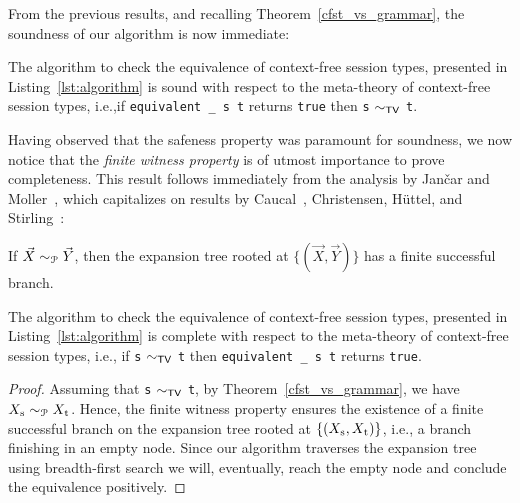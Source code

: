 From the previous results, and recalling Theorem~\ref{cfst_vs_grammar}, 
the soundness of our algorithm is now immediate:

\begin{theorem}
	The algorithm to check the equivalence of context-free session types,
	presented in Listing~\ref{lst:algorithm} is sound with respect to the 
	meta-theory of context-free session types, i.e.,\linebreak if 
	\lstinline|equivalent _ s t| returns 
	\lstinline|true| then \lstinline|s| $\sim_{\mathsf{TV}}$ \lstinline|t|.
\end{theorem}

Having observed that the safeness property was paramount for soundness, 
we now notice that the \emph{finite witness property} is of utmost 
importance to prove completeness. This result follows immediately from the
 analysis by Jan{\v{c}}ar and Moller~\cite{janvcar1999techniques}, which 
 capitalizes on results by 
Caucal~\cite{caucal1986decidabilite}, Christensen, H{\"{u}}ttel, and 
Stirling~\cite{DBLP:journals/iandc/ChristensenHS95}:

\begin{proposition} 
\label{finite_witness}
	If $\vec X \sim_{\mathcal{P}} \vec Y$, then the expansion tree rooted at 
	$\{(\vec X, \vec Y)\}$ has a finite successful branch.
\end{proposition}



\begin{theorem}
	The algorithm to check the equivalence of context-free session types,
	presented in Listing~\ref{lst:algorithm} is complete with respect to the 
	meta-theory of context-free session types, i.e., \linebreak if 
	\lstinline|s| $\sim_{\mathsf{TV}}$ \lstinline|t| then 
	\lstinline|equivalent _ s t| returns \lstinline|true|.
\end{theorem}

\begin{proof}
	Assuming that \lstinline|s| $\sim_{\mathsf{TV}}$ \lstinline|t|, by 
	Theorem~\ref{cfst_vs_grammar}, we 
	have $X_{\text{\lstinline|s|}} \ProdEquiv X_{\text{\lstinline|t|}}$.
	Hence, the finite witness property 
	ensures the existence of a finite successful branch on the expansion 
	tree rooted at $\{(X_{\text{\lstinline|s|}},X_{\text{\lstinline|t|}})\}$, 
	i.e., a branch finishing in an empty node.
	Since our algorithm traverses 
	the expansion tree using breadth-first search we will, eventually, 
	reach the empty node and conclude the equivalence positively.
\end{proof}
